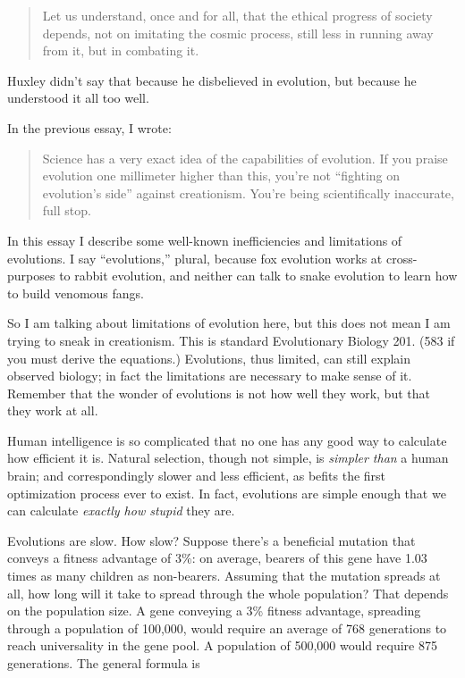 \begin{quote}
 Let us understand, once and for all, that the ethical progress of
society depends, not on imitating the cosmic process, still less in
running away from it, but in combating it.
\end{quote}

{
 Huxley didn't say that because he disbelieved in
evolution, but because he understood it all too well.}

\myendsectiontext


\bigskip


{
 In the previous essay, I wrote:}

\begin{quote}
{
 Science has a very exact idea of the capabilities of evolution. If
you praise evolution one millimeter higher than this,
you're not ``fighting on
evolution's side'' against
creationism. You're being scientifically inaccurate,
full stop.}
\end{quote}

{
 In this essay I describe some well-known inefficiencies and
limitations of evolutions. I say
``evolutions,'' plural, because fox
evolution works at cross-purposes to rabbit evolution, and neither can
talk to snake evolution to learn how to build venomous fangs.}

{
 So I am talking about limitations of evolution here, but this does
not mean I am trying to sneak in creationism. This is standard
Evolutionary Biology 201. (583 if you must derive the equations.)
Evolutions, thus limited, can still explain observed biology; in fact
the limitations are necessary to make sense of it. Remember that the
wonder of evolutions is not how well they work, but that they work at
all.}

{
 Human intelligence is so complicated that no one has any good way
to calculate how efficient it is. Natural selection, though not simple,
is \textit{simpler than} a human brain; and correspondingly slower and
less efficient, as befits the first optimization process ever to exist.
In fact, evolutions are simple enough that we can calculate
\textit{exactly how stupid} they are.}

{
 Evolutions are slow. How slow? Suppose there's a
beneficial mutation that conveys a fitness advantage of 3\%: on
average, bearers of this gene have 1.03 times as many children as
non-bearers. Assuming that the mutation spreads at all, how long will
it take to spread through the whole population? That depends on the
population size. A gene conveying a 3\% fitness advantage, spreading
through a population of 100,000, would require an average of 768
generations to reach universality in the gene pool. A population of
500,000 would require 875 generations. The general formula is}

